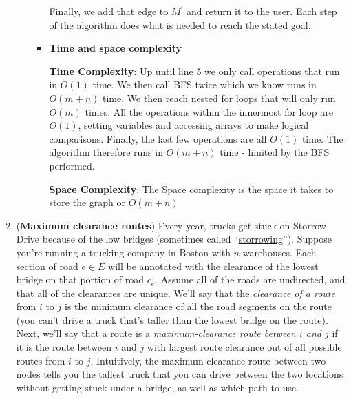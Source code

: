 \documentclass[letterpaper,11pt]{article}
\begin{document}
\begin{enumerate}
\begin{enumerate}
\begin{itemize}
                    Finally, we add that edge to $M ^{\prime}$ and return it to the 
                    user. Each step of the algorithm does what is needed to reach
                    the stated goal.\\

                \item \textbf{Time and space complexity}
                    
                    \textbf{Time Complexity}: Up until line 5 we only call 
                    operations that run in $O\left( 1 \right) $ time. We then 
                    call BFS twice which we know runs in $O\left( m + n \right) $ 
                    time. We then reach nested for loops that will only run
                    $O\left( m \right) $ times. All the operations within
                    the innermost for loop are $O\left( 1 \right) $, setting 
                    variables and accessing arrays to make logical comparisons.
                    Finally, the last few operations are all $O\left( 1 \right) $ 
                    time. The algorithm therefore runs in $O\left( m + n \right) $ 
                    time - limited by the BFS performed.

                    \textbf{Space Complexity}: The Space complexity is the space
                    it takes to store the graph or $O\left( m + n \right) $




            \end{itemize}

    \end{enumerate}



    \newpage
    \item(\textbf{Maximum clearance routes}) Every year, trucks get stuck on Storrow Drive because of the low bridges (sometimes called ``\href{https://duckduckgo.com/?q=storrowing&t=ffab&iar=images&iax=images&ia=images}{storrowing}''). Suppose you're running a trucking company in Boston with $n$ warehouses. Each section of road $e\in E$ will be annotated with the clearance of the lowest bridge on that portion of road $c_e$. Assume all of the roads are undirected, and that all of the clearances are unique.  We'll say that the \emph{clearance of a route} from $i$ to $j$ is the minimum clearance of all the road segments on the route (you can't drive a truck that's taller than the lowest bridge on the route). Next, we'll say that a route is a \emph{maximum-clearance route between $i$ and $j$} if it is the route between $i$ and $j$ with largest route clearance out of all possible routes from $i$ to $j$. Intuitively, the maximum-clearance route between two nodes tells you the tallest truck that you can drive between the two locations without getting stuck under a bridge, as well as which path to use.
    

\end{enumerate}
\end{document}
